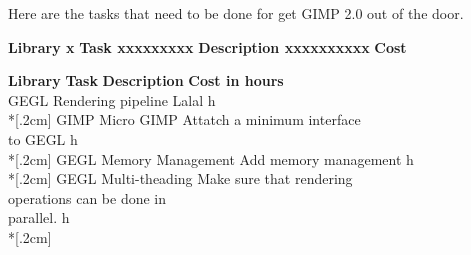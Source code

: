 Here are the tasks that need to be done for get GIMP 2.0 out of the door.

\begin{tabbing}
{\bf \large Library x} \= {\bf \large Task xxxxxxxxx} \= {\bf \large Description xxxxxxxxxx}	\= {\bf \large Cost} \kill

{\bf \large Library} \> {\bf \large Task} \> {\bf \large Description} \> {\bf \large Cost in hours}\\

GEGL	\> Rendering pipeline		\>Lalal		
 h\\*[.2cm]
GIMP	\> Micro GIMP			\> Attatch a minimum interface \\
					\>\>to GEGL
 h\\*[.2cm]
GEGL	\> Memory Management		\> Add memory management 
 h\\*[.2cm]
GEGL	\> Multi-theading 		\> Make sure that rendering \\
					\>\>operations can be done in \\
					\>\>parallel.
 h\\*[.2cm] 
\end{tabbing}
			

